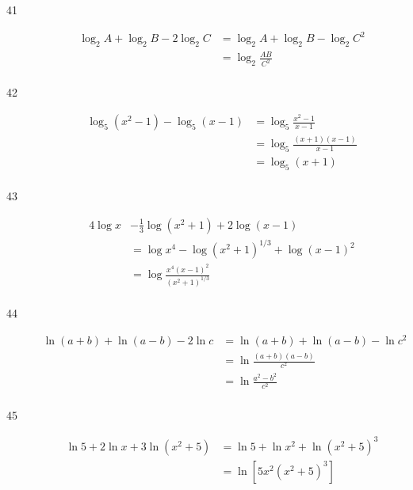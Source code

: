 \documentclass{exam}
\begin{document}
\begin{description}
      \item[41] 
        \begin{align*}
          \log_2 A + \log_2 B - 2 \log_2 C &= \log_2 A + \log_2 B - \log_2 C^2 \\
                                           &= \boxed{\log_2 \frac{AB}{C^2}} \\
        \end{align*}

      \item[42] 
        \begin{align*}
          \log_5 (x^2 - 1) - \log_5 (x - 1) &= \log_5 \frac{x^2 - 1}{x - 1} \\
                                            &= \log_5 \frac{(x + 1)(x - 1)}{x - 1} \\
                                            &= \boxed{\log_5 (x + 1)} \\
        \end{align*}

      \item[43] 
        \begin{align*}
          4 \log x &- \frac{1}{3} \log (x^2 + 1) + 2 \log (x - 1) \\
                   &= \log x^4 - \log (x^2 + 1)^{1/3} + \log (x - 1)^2 \\
                   &= \boxed{\log \frac{x^4 (x - 1)^2}{(x^2 + 1)^{1/3}}} \\
        \end{align*}

      \item[44] 
        \begin{align*}
          \ln(a + b) + \ln(a - b) - 2 \ln c &= \ln(a + b) + \ln(a - b) - \ln c^2 \\
                                            &= \ln \frac{(a + b)(a - b)}{c^2} \\
                                            &= \boxed{\ln \frac{a^2 - b^2}{c^2}} \\
        \end{align*}

      \item[45] 
        \begin{align*}
          \ln 5 + 2 \ln x + 3 \ln (x^2 + 5) &= \ln 5 + \ln x^2 + \ln (x^2 + 5)^3 \\
                                            &= \boxed{\ln \left[ 5x^2 (x^2 + 5)^3 \right]} \\
        \end{align*}


\end{description}
\end{document}
